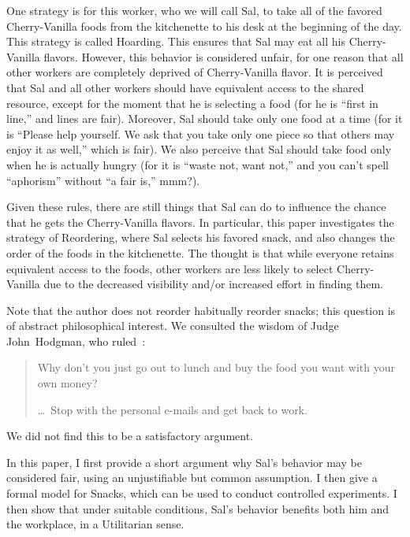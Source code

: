 \documentclass[twocolumn]{article}
\begin{document}
One strategy is for this worker, who we will call Sal, to take all of the favored Cherry-Vanilla foods from the kitchenette to his desk at the beginning of the day. This strategy is called Hoarding. This ensures that Sal may eat all his Cherry-Vanilla flavors. However, this behavior is considered unfair, for one reason that all other workers are completely deprived of Cherry-Vanilla flavor. It is perceived that Sal and all other workers should have equivalent access to the shared resource, except for the moment that he is selecting a food (for he is ``first in line,'' and lines are fair). Moreover, Sal should take only one food at a time (for it is ``Please help yourself. We ask that you take only one piece so that others may enjoy it as well,'' which is fair). We also perceive that Sal should take food only when he is actually hungry (for it is ``waste not, want not,'' and you can't spell ``aphorism'' without ``a fair is,'' mmm?).

Given these rules, there are still things that Sal can do to influence the chance that he gets the Cherry-Vanilla flavors. In particular, this paper investigates the strategy of Reordering, where Sal selects his favored snack, and also changes the order of the foods in the kitchenette. The thought is that while everyone retains equivalent access to the foods, other workers are less likely to select Cherry-Vanilla due to the decreased visibility and/or increased effort in finding them.

Note that the author does not reorder habitually reorder snacks; this question is of abstract philosophical interest. We consulted the wisdom of Judge John~Hodgman, who ruled~\cite{hodgman2016snacks}:

\begin{quotation}
  \noindent Why don't you just go out to lunch and buy the food you want with
  your own money?
  
  \noindent \ldots\ Stop with the personal e-mails and get back to work.
\end{quotation}

We did not find this to be a satisfactory argument.

\smallskip
In this paper, I first provide a short argument why Sal's behavior may be considered fair, using an unjustifiable but common assumption. I then give a formal model for Snacks, which can be used to conduct controlled experiments. I then show that under suitable conditions, Sal's behavior benefits both him and the workplace, in a Utilitarian sense.
\end{document}
